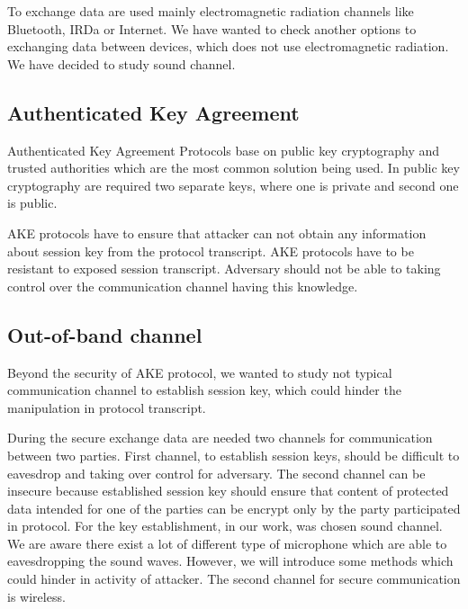 \documentclass[11pt,titlepage]{article}
\theoremstyle{plain}
\begin{document}
\vspace{5mm}

To exchange data are used mainly electromagnetic radiation channels like Bluetooth, IRDa or Internet. We have wanted to check another options to exchanging data between devices, which does not use electromagnetic radiation. We have decided to study sound channel.


\subsection{Authenticated Key Agreement}

Authenticated Key Agreement Protocols base on public key cryptography and trusted authorities which are the most common solution being used. In public key cryptography are required two separate keys, where one is private and second one is public.

\vspace{5mm}

AKE protocols have to ensure that attacker can not obtain any information about session key from the protocol transcript. AKE protocols have to be resistant to exposed session transcript. Adversary should not be able to taking control over the communication channel having this knowledge.

\subsection{Out-of-band channel}
Beyond the security of AKE protocol, we wanted to study not typical communication channel to establish session key, which could hinder the manipulation in protocol transcript.

\vspace{5mm}

During the secure exchange data are needed two channels for communication between two parties. First channel, to establish session keys, should be difficult to eavesdrop and taking over control for adversary. The second channel can be insecure because established session key should ensure that content of protected data intended for one of the parties can be encrypt only by the party participated in protocol. For the key establishment, in our work, was chosen sound channel. We are aware there exist a lot of different type of microphone which are able to eavesdropping the sound waves. However, we will introduce some methods which could hinder in activity of attacker. The second channel for secure communication is wireless.
\end{document}
